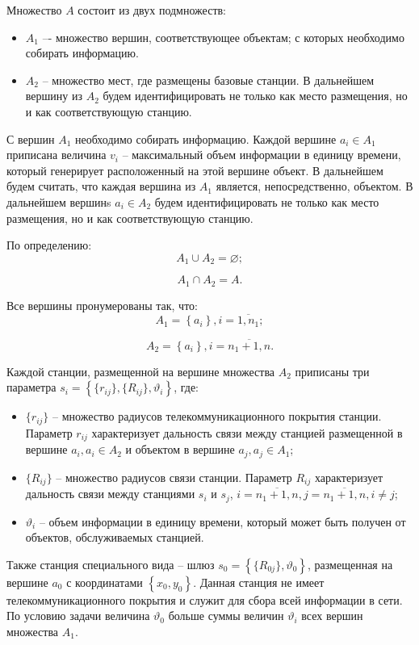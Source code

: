 Множество $A$ состоит из двух подмножеств:
\begin{itemize}
    \item $A_1$ –- множество вершин, соответствующее объектам; с которых необходимо собирать информацию. 
    \item $A_2$ -- множество мест, где размещены базовые станции. В дальнейшем вершину из $A_2$ будем идентифицировать  не только как место размещения, но и как соответствующую станцию.
\end{itemize}
С вершин $A_1$ необходимо собирать информацию. Каждой вершине $a_i \in A_1$ приписана величина $v_i$ -- максимальный объем информации в единицу времени, который генерирует расположенный на этой вершине объект.  В дальнейшем будем считать, что каждая вершина из $A_1$ является, непосредственно, объектом. В дальнейшем вершинs  $a_i \in A_2$ будем идентифицировать не только как место размещения, но и как соответствующую станцию.

По определению:
$$
A_1 \cup A_2 = \varnothing;
$$

$$
A_1 \cap A_2 = A.
$$

Все вершины пронумерованы так, что:
$$
A_1 = \left\{a_i \right\}, i= \overline{1,n_1};
$$

$$
A_2 = \left\{ a_i  \right\}, i= \overline{n_1+1,n}.
$$

Каждой станции, размещенной на вершине множества $A_2$ приписаны три параметра $s_i = \left\{ \{r_{ij}\}, \{R_{ij}\},\vartheta_i \right\} $, где:

\begin{itemize}
    \item $\{r_{ij}\}$ -- множество радиусов телекоммуникационного покрытия станции. Параметр $r_{ij}$ характеризует дальность связи между станцией размещенной в вершине $a_i, a_i \in A_2$ и объектом в вершине $a_j, a_j \in A_1$;
    \item $\{R_{ij}\}$ -- множество радиусов связи станции. Параметр $R_{ij}$ характеризует дальность связи между станциями $s_i$ и $s_j$, $i= \overline{n_1+1,n}, j = \overline{n_1+1,n}, i \neq j$;
    \item $\vartheta_i$ -- объем информации в единицу времени, который может быть получен от объектов, обслуживаемых станцией.
\end{itemize}

Также станция специального вида -- шлюз  $s_0 = \left\{\{R_{0j}\}, \vartheta_0 \right\} $, размещенная на вершине $a_0$ с координатами $\left\{x_0, y_0 \right\}$. Данная станция не имеет телекоммуникационного покрытия и служит для сбора всей информации в сети. По условию задачи величина $\vartheta_0$ больше суммы величин $\vartheta_i$ всех вершин множества $A_1$.


